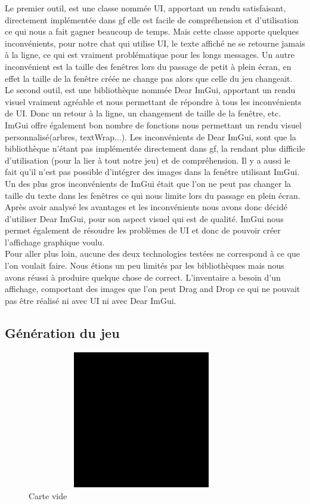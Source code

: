 \documentclass[a4paper, 12pt, twoside]{article}
\begin{document}
Le premier outil, est une classe nommée UI, apportant un rendu satisfaisant, directement implémentée dans gf elle est facile de compréhension et d'utilisation ce qui nous a fait gagner beaucoup de temps.
Mais cette classe apporte quelques inconvénients, pour notre chat qui utilise UI, le texte affiché
ne se retourne jamais à la ligne, ce qui est vraiment problématique pour les
longs messages. Un autre inconvénient est la taille des fenêtres lors du passage de petit à plein écran, en effet la taille de la fenêtre créée ne change pas alors que celle du jeu changeait.
\\Le second outil, est une bibliothèque nommée Dear ImGui, apportant un rendu visuel vraiment agréable et nous permettant de répondre à tous les inconvénients de UI. Donc un retour à la ligne, un changement de taille de la fenêtre, etc. ImGui offre également bon nombre de fonctions nous permettant un rendu visuel personnalisé(arbres, textWrap...).
Les inconvénients de Dear ImGui, sont que la bibliothèque n'étant pas implémentée directement dans gf, la rendant plus difficile d'utilisation (pour la lier à tout notre jeu) et de compréhension. Il y a aussi le fait qu'il n'est pas possible d'intégrer des images dans la fenêtre utilisant ImGui. Un des plus gros inconvénients de ImGui était que l'on ne peut pas changer la taille du texte dans les fenêtres ce qui nous limite lors du passage en plein écran.\\

Après avoir analysé les avantages et les inconvénients nous avons donc décidé d'utiliser Dear ImGui, pour son aspect visuel qui est de qualité. ImGui nous permet également de résoudre les problèmes de UI et donc de pouvoir créer l'affichage graphique voulu.
\\
Pour aller plus loin, aucune des deux technologies testées ne correspond à ce que l'on voulait faire. Nous étions un peu limités par les bibliothèques mais nous avons réussi à produire quelque chose de correct. L'inventaire a besoin d'un affichage, comportant des images que l'on peut Drag and Drop ce qui ne pouvait pas être réalisé ni avec UI ni avec Dear ImGui.
\newpage

\subsection{Génération du jeu}
\begin{figure}[H]
    \center
    \includegraphics[width=10cm,height=6cm]{./Procedural/void}
    \caption{Carte vide}
    \label{vide}
\end{figure}
\end{document}

